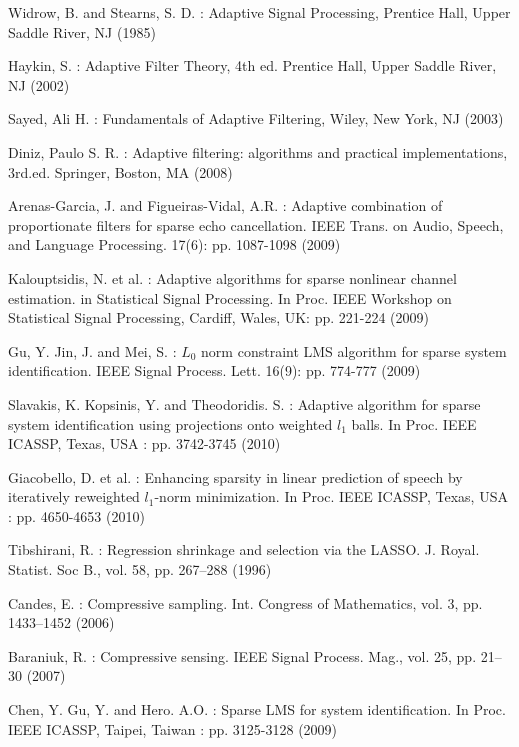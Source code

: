 \documentclass[conference]{IEEEtran}
\begin{document}
\begin{thebibliography}{00}


 Widrow, B. and Stearns, S. D. : Adaptive Signal Processing,  Prentice Hall, Upper Saddle River, NJ (1985)

 Haykin, S. : Adaptive Filter Theory, 4th ed. Prentice Hall, Upper Saddle River, NJ (2002)

 Sayed, Ali H. : Fundamentals of Adaptive Filtering, Wiley, New York, NJ (2003)

 Diniz, Paulo S. R. : Adaptive filtering: algorithms and practical implementations, 3rd.ed. Springer, Boston, MA (2008)

 Arenas-Garcia, J.  and Figueiras-Vidal, A.R. : Adaptive combination of proportionate filters for sparse echo cancellation. IEEE Trans. on Audio, Speech, and Language Processing. 17(6): pp. 1087-1098 (2009)

 Kalouptsidis, N. et al. : Adaptive algorithms for sparse nonlinear channel estimation. in Statistical Signal Processing. In Proc. IEEE Workshop on Statistical Signal Processing, Cardiff, Wales, UK: pp. 221-224 (2009)

 Gu, Y. Jin, J. and Mei, S. : $L_0$ norm constraint LMS algorithm for sparse system identification. IEEE Signal Process. Lett. 16(9): pp. 774-777 (2009)

 Slavakis, K. Kopsinis, Y. and Theodoridis. S. : Adaptive algorithm for sparse system identification using projections onto weighted $l_1$ balls. In Proc. IEEE ICASSP, Texas, USA : pp. 3742-3745 (2010)  
 
 Giacobello, D. et al. : Enhancing sparsity in linear prediction of speech by iteratively reweighted $l_1$-norm minimization. In Proc. IEEE ICASSP,  Texas, USA : pp. 4650-4653 (2010) 

 Tibshirani, R. : Regression shrinkage and selection via the {LASSO}. J.
Royal. Statist. Soc B., vol. 58, pp. 267–288 (1996)

 Candes, E. : Compressive sampling. Int. Congress of Mathematics, vol.
3, pp. 1433–1452 (2006)

 Baraniuk, R. : Compressive sensing. IEEE Signal Process. Mag.,
vol. 25, pp. 21–30 (2007)

  Chen, Y. Gu, Y. and Hero. A.O. : Sparse LMS for system identification. In Proc. IEEE ICASSP, Taipei, Taiwan : pp. 3125-3128 (2009)


\end{thebibliography}
\end{document}
